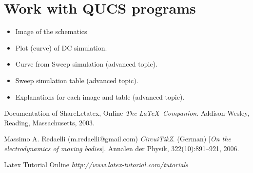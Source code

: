\documentclass{report}
\begin{document}
		
		\section{Work with QUCS programs}
		
		
		\begin{itemize}
			\item Image of the schematics
			\item Plot (curve) of DC simulation.
			\item Curve from Sweep simulation (advanced topic).
			\item Sweep simulation table (advanced topic).
			\item Explanations for each image and table (advanced topic).
		\end{itemize}
		
		
		
		
		\begin{thebibliography}{9}
			Documentation of ShareLetatex, Online
			\textit{The \LaTeX\ Companion}. 
			Addison-Wesley, Reading, Massachusetts, 2003.
			
			Massimo A. Redaelli (m.redaelli@gmail.com)
			\textit{CircuiTikZ}. (German) 
			[\textit{On the electrodynamics of moving bodies}]. 
			Annalen der Physik, 322(10):891–921, 2006.
			
			Latex Tutorial Online
			\textit{http://www.latex-tutorial.com/tutorials}
		\end{thebibliography}
		
	
\end{document}

